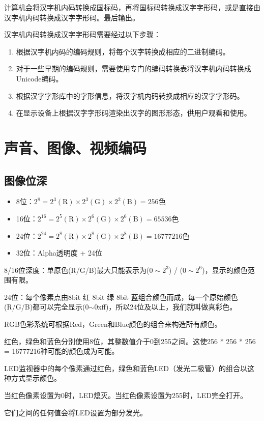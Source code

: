 计算机会将汉字机内码转换成国标码，再将国标码转换成汉字字形码，或是直接由汉字机内码转换成汉字字形码。最后输出。 

汉字机内码转换成汉字字形码需要经过以下步骤：

\begin{enumerate}
  \item 根据汉字机内码的编码规则，将每个汉字转换成相应的二进制编码。
  \item 对于一些早期的编码规则，需要使用专门的编码转换表将汉字机内码转换成Unicode编码。
  \item 根据汉字字形库中的字形信息，将汉字机内码转换成相应的汉字字形码。
  \item 在显示设备上根据汉字字形码渲染出汉字的图形形态，供用户观看和使用。
\end{enumerate}

\section{声音、图像、视频编码}

\subsection{图像位深}

\begin{itemize}
  \item 8位：$2^8=2^3(\mathrm{R})\times 2^3(\mathrm{G})\times 2^2(\mathrm{B})=256$色
  \item 16位：$2^16=2^5(\mathrm{R})\times 2^6(\mathrm{G})\times 2^6(\mathrm{B})=65536$色
  \item 24位：$2^24=2^8(\mathrm{R})\times 2^8(\mathrm{G})\times 2^8(\mathrm{B})=16777216$色
  \item 32位：Alpha透明度 + 24位
\end{itemize}

8/16位深度：单原色(R/G/B)最大只能表示为($0 \sim 2^3$) / ($0 \sim 2^6$)，显示的颜色范围有限。

24位：每个像素点由8bit 红 8bit 绿 8bit 蓝组合颜色而成，每一个原始颜色(R/G/B)都可以完全显示(0$\sim$0xff)，所以24位及以上，我们就叫做真彩色。

RGB色彩系统可根据Red，Green和Blue颜色的组合来构造所有颜色。

红色，绿色和蓝色分别使用8位，其整数值介于0到255之间。这使256 * 256 * 256 = 16777216种可能的颜色成为可能。

LED监视器中的每个像素通过红色，绿色和蓝色LED（发光二极管）的组合以这种方式显示颜色。

当红色像素设置为0时，LED熄灭。当红色像素设置为255时，LED完全打开。

它们之间的任何值会将LED设置为部分发光。

